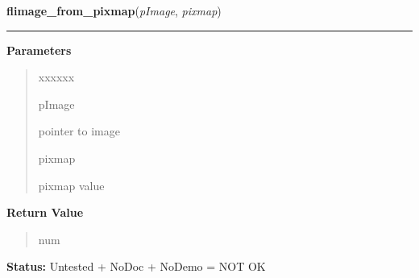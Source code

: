 \hspace{.8\funcindent}\begin{boxedminipage}{\funcwidth}

    \raggedright \textbf{flimage\_from\_pixmap}(\textit{pImage}, \textit{pixmap})

    \vspace{-1.5ex}

    \rule{\textwidth}{0.5\fboxrule}
\setlength{\parskip}{2ex}
\setlength{\parskip}{1ex}
      \textbf{Parameters}
      \vspace{-1ex}

      \begin{quote}
        \begin{Ventry}{xxxxxx}

          \item[pImage]

          pointer to image

          \item[pixmap]

          pixmap value

        \end{Ventry}

      \end{quote}

      \textbf{Return Value}
    \vspace{-1ex}

      \begin{quote}
      num

      \end{quote}

\textbf{Status:} Untested + NoDoc + NoDemo = NOT OK



    \end{boxedminipage}

    \label{xformslib:flflimage:flimage_to_pixmap}

    \vspace{0.5ex}

